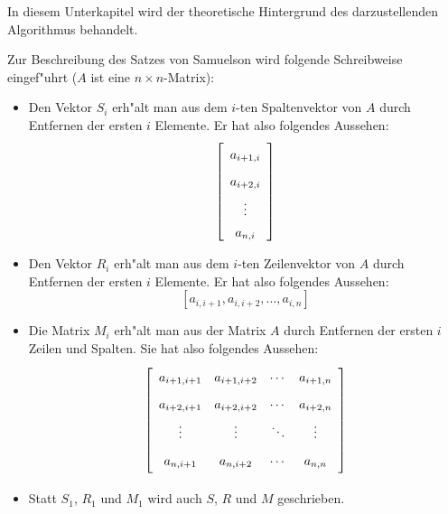 
\label{SecSamuelson}

In diesem Unterkapitel wird der theoretische Hintergrund des
darzustellenden Algorithmus behandelt.

Zur Beschreibung des Satzes von Samuelson \cite{Samu42} wird folgende
Schreibweise eingef"uhrt ($A$ ist eine $n \times n$-Matrix):
\label{SeiteRMSSchreibweise}
\begin{itemize}
\item
     Den Vektor $S_i$ erh"alt man aus dem $i$-ten Spaltenvektor von $A$
     durch Entfernen der ersten $i$ Elemente. Er hat also folgendes
     Aussehen:
     \[ \left[
        \begin{array}{c}
            a_{i+1,i} \MatStrut \\
            a_{i+2,i} \MatStrut \\
            \vdots    \MatStrut \\
            a_{n,i}
        \end{array}
        \right]
     \]
\item
     Den Vektor $R_i$ erh"alt man aus dem $i$-ten Zeilenvektor von $A$
     durch Entfernen der ersten $i$ Elemente. Er hat also folgendes
     Aussehen:
     \[ [a_{i,i+1}, a_{i,i+2}, \ldots , a_{i,n} ] \]
\item
     Die Matrix $M_i$ erh"alt man aus der Matrix $A$ durch Entfernen
     der ersten $i$ Zeilen und Spalten. Sie hat also folgendes Aussehen:
     \[ \left[
        \begin{array}{cccc}
            a_{i+1,i+1} & a_{i+1,i+2} & \cdots & a_{i+1,n} \MatStrut \\
            a_{i+2,i+1} & a_{i+2,i+2} & \cdots & a_{i+2,n} \MatStrut \\
            \vdots      & \vdots      & \ddots & \vdots    \MatStrut \\
            a_{n,i+1}   & a_{n,i+2}   & \cdots & a_{n,n}   \MatStrut
        \end{array}
        \right]
     \]
\item
     Statt $S_1$, $R_1$ und $M_1$ wird auch $S$, $R$ und $M$ geschrieben.
\end{itemize}

